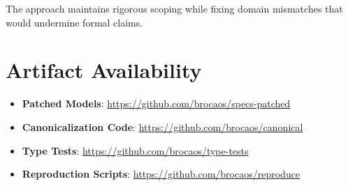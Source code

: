 \documentclass[12pt]{article}
\begin{document}
The approach maintains rigorous scoping while fixing domain mismatches that would undermine formal claims.

\section*{Artifact Availability}

\begin{itemize}
    \item \textbf{Patched Models}: \url{https://github.com/brocaos/specs-patched}
    \item \textbf{Canonicalization Code}: \url{https://github.com/brocaos/canonical}
    \item \textbf{Type Tests}: \url{https://github.com/brocaos/type-tests}
    \item \textbf{Reproduction Scripts}: \url{https://github.com/brocaos/reproduce}
\end{itemize}
\end{document}
